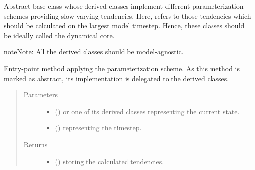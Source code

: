 \documentclass[letterpaper,10pt,english]{sphinxmanual}
\begin{document}

\begin{fulllineitems}
\label{\detokenize{api:tasmania.parameterizations.slow_tendencies.SlowTendency}}
Abstract base class whose derived classes implement different parameterization schemes
providing slow-varying tendencies. Here,  refers to those tendencies which
should be calculated on the largest model timestep. Hence, these classes should be ideally
called  the dynamical core.

\begin{sphinxadmonition}{note}{Note:}
All the derived classes should be model-agnostic.
\end{sphinxadmonition}

\begin{fulllineitems}
\label{\detokenize{api:tasmania.parameterizations.slow_tendencies.SlowTendency.__call__}}
Entry-point method applying the parameterization scheme.
As this method is marked as abstract, its implementation is delegated to the derived classes.
\begin{quote}\begin{description}
\item[{Parameters}] \leavevmode\begin{itemize}
\item {} 
 () \textendash{} {\hyperref[\detokenize{api:tasmania.storages.grid_data.GridData}]{}} or one of its derived classes representing the current state.

\item {} 
 () \textendash{}  representing the timestep.

\end{itemize}

\item[{Returns}] \leavevmode
\begin{itemize}
\item {} 
 () \textendash{} {\hyperref[\detokenize{api:tasmania.storages.grid_data.GridData}]{}} storing the calculated tendencies.


\end{itemize}
\end{description}
\end{quote}
\end{fulllineitems}
\end{fulllineitems}
\end{document}
